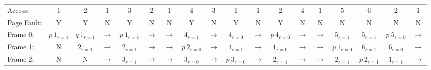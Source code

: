 \documentclass{report}
\begin{document}
\begin{tiny}
	\begin{center}
		\begin{tabular}{l c c c c c c c c c c c c c c c c c}
			Access:     & 1             & 2             & 1     & 3             & 2     & 1     & 4             & 3     & 1             & 1     & 2             & 4     & 1     & 5             & 6             & 2             & 1     \\
			Page Fault: & Y             & Y             & N     & Y             & N     & N     & Y             & N     & Y             & N     & Y             & N     & N     & N             & N             & N             & N     \\
			Frame 0:    & $p \ 1_{r=1}$ & $q \ 1_{r=1}$ & $\to$ & $p \ 1_{r=1}$ & $\to$ & $\to$ & $4_{r=1}$     & $\to$ & $4_{r=0}$     & $\to$ & $p \ 4_{r=0}$ & $\to$ & $\to$ & $5_{r=1}$     & $5_{r=1}$     & $p \ 5_{r=0}$ & $\to$ \\
			Frame 1:    & N             & $2_{r=1}$     & $\to$ & $2_{r=1}$     & $\to$ & $\to$ & $p \ 2_{r=0}$ & $\to$ & $1_{r=1}$     & $\to$ & $1_{r=0}$     & $\to$ & $\to$ & $p \ 1_{r=0}$ & $6_{r=1}$     & $6_{r=0}$     & $\to$ \\
			Frame 2:    & N             & N             & $\to$ & $3_{r=1}$     & $\to$ & $\to$ & $3_{r=0}$     & $\to$ & $p \ 3_{r=0}$ & $\to$ & $2_{r=1}$     & $\to$ & $\to$ & $2_{r=1}$     & $p \ 2_{r=1}$ & $1_{r=1}$     & $\to$ \\
		\end{tabular}
	\end{center}
\end{tiny}
\end{document}
